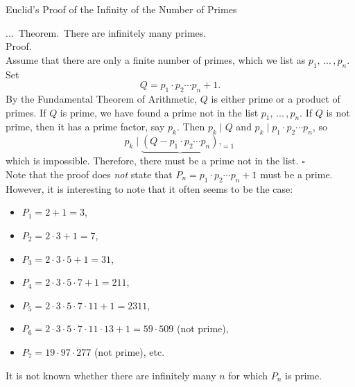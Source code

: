 \documentclass[smaller,hyperref={CJKbookmarks=true}]{beamer}
\newenvironment{PROOF}{{\noindent\!\sf\alert{Proof.}}\\}{\hfill$\square$\\}
\newcounter{zhuo}[subsection]
\renewcommand{\thezhuo}{\thesection.\thesubsection.\arabic{zhuo}}
\newenvironment{THEOREM}{\stepcounter{zhuo}\alert{\thezhuo.~Theorem.\,}}{}
\begin{document}
\begin{frame}{Euclid's Proof of the Infinity of the Number of Primes}
\begin{spacing}{1.05}
\begin{THEOREM}
There are infinitely many primes.\\[4pt]
\end{THEOREM}
\begin{PROOF}
Assume that there are only a finite number of primes, which we list as $p_1,\,...\,,p_n$. Set
\[Q=p_1\cdot p_2\cdots p_n+1.\]
By the Fundamental Theorem of Arithmetic, $Q$ is either prime or a product of primes. If $Q$ is prime, we have found a prime not in the list $p_1,\,...\,,p_n$. If $Q$ is not prime, then it has a prime factor, say $p_k$. Then $p_k\mid Q$ and $p_k\mid p_1\cdot p_2\cdots p_n$, so
\[p_k\mid\underbrace{(Q-p_1\cdot p_2\cdots p_n)},_{=1}\]
which is impossible. Therefore, there must be a prime not in the list.
\end{PROOF}
\newpage
\vspace*{8pt}
Note that the proof does \emph{not} state that $P_n=p_1\cdot p_2\cdots p_n+1$ must be a prime. However, it is interesting to note that it often seems to be the case:
\begin{itemize}
  \item $P_1=2+1=3$,
  \item $P_2=2\cdot3+1=7$,
  \item $P_3=2\cdot3\cdot5+1=31$,
  \item $P_4=2\cdot3\cdot5\cdot7+1=211$,
  \item $P_5=2\cdot3\cdot5\cdot7\cdot11+1=2311$,
  \item $P_6=2\cdot3\cdot5\cdot7\cdot11\cdot13+1=59\cdot509$ (not prime),
  \item $P_7=19\cdot97\cdot277$ (not prime), etc.
\end{itemize}
It is not known whether there are infinitely many $n$ for which $P_n$ is prime.
\end{spacing}
\end{frame}
\end{document}

